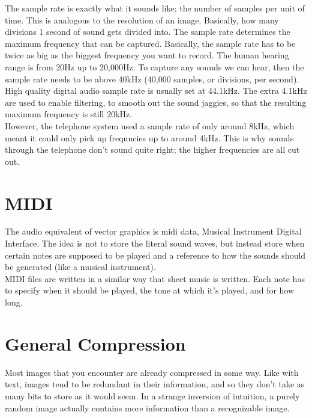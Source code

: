 The sample rate is exactly what it sounds like; the number of samples per unit of time. This is analogous to the resolution of an image. Basically, how many divisions 1 second of sound gets divided into. The sample rate determines the maximum frequency that can be captured. Basically, the sample rate has to be twice as big as the biggest frequency you want to record. The human hearing range is from 20Hz up to 20,000Hz. To capture any sounds we can hear, then the sample rate needs to be above 40kHz (40,000 samples, or divisions, per second). High quality digital audio sample rate is usually set at 44.1kHz. The extra 4.1kHz are used to enable filtering, to smooth out the sound jaggies, so that the resulting maximum frequency is still 20kHz.\\

However, the telephone system used a sample rate of only around 8kHz, which meant it could only pick up frequncies up to around 4kHz. This is why sounds through the telephone don't sound quite right; the higher frequencies are all cut out.

\section{MIDI}

The audio equivalent of vector graphics is midi data, Musical Instrument Digital Interface. The idea is not to store the literal sound waves, but instead store when certain notes are supposed to be played and a reference to how the sounds should be generated (like a musical instrument).\\

MIDI files are written in a similar way that sheet music is written. Each note has to specify when it should be played, the tone at which it's played, and for how long.


\section{General Compression}

Most images that you encounter are already compressed in some way. Like with text, images tend to be redundant in their information, and so they don't take as many bits to store as it would seem. In a strange inversion of intuition, a purely random image actually contains more information than a recognizable image.

\begin{center}\end{center}

